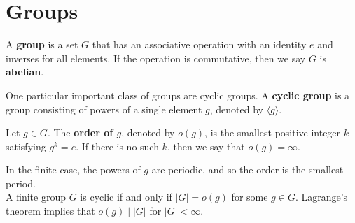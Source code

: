 \documentclass{memoir}
\begin{document}
\chapter{Groups}
\label{cha:groups}
\begin{defn}[Group]
	A \textbf{group} is a set \(G\) that has an associative operation with an identity \(e\) and inverses for all elements. If the operation is commutative, then we say \(G\) is \textbf{abelian}.
\end{defn}
One particular important class of groups are cyclic groups. A \textbf{cyclic group} is a group consisting of powers of a single element \(g\), denoted by \( \langle g \rangle \).

\begin{defn}[Order]
	Let \(g \in G\). The \textbf{order of \(g\)}, denoted by \(o(g)\), is the smallest positive integer \(k\) satisfying \(g^{k}=e\). If there is no such \(k\), then we say that \(o(g) = \infty\).
\end{defn}
In the finite case, the powers of \(g\) are periodic, and so the order is the smallest period. \\

A finite group \(G\) is cyclic if and only if \(\left| G \right| = o(g)\) for some \(g \in G\). Lagrange's theorem implies that \(o(g) \mid \left| G \right| \) for \(\left| G \right| <\infty\).
	
\end{document}
